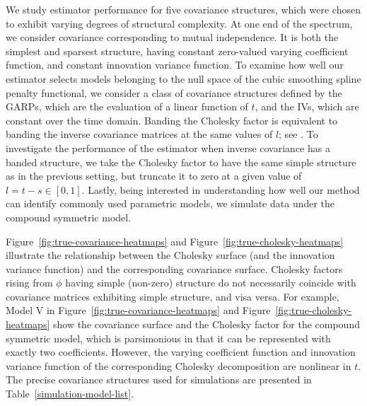 \documentclass[12pt]{article}
\theoremstyle{definition}
\begin{document}
We study estimator performance for five covariance structures, which were chosen to exhibit varying degrees of structural complexity. At one end of the spectrum, we consider covariance corresponding to mutual independence. It is both the simplest and sparsest structure, having constant zero-valued varying coefficient function, and constant innovation variance function. To examine how well our estimator selects models belonging to the null space of the cubic smoothing spline penalty functional, we consider a class of covariance structures defined by the GARPs, which are the evaluation of a linear function of $t$, and the IVs, which are constant over the time domain. Banding the Cholesky factor is equivalent to banding the inverse covariance matrices at the same values of $l$; see \citet{bickel2008regularized}.  To investigate the performance of the estimator when inverse covariance has a banded structure, we take the Cholesky factor to have the same simple structure as in the previous setting, but truncate it to zero at a given value of $l = t - s \in \left[0,1\right]$. Lastly, being interested in understanding how well our method can identify commonly used parametric models, we simulate data under the compound symmetric model. 

\bigskip

Figure~\ref{fig:true-covariance-heatmaps} and Figure~\ref{fig:true-cholesky-heatmaps} illustrate the relationship between the Cholesky surface (and the innovation variance function) and the corresponding covariance surface.  Cholesky factors rising from $\phi$ having simple (non-zero) structure do not necessarily coincide with covariance matrices exhibiting simple structure, and visa versa. For example, Model V in Figure~\ref{fig:true-covariance-heatmaps} and Figure~\ref{fig:true-cholesky-heatmaps} show the covariance surface and the Cholesky factor for the compound symmetric model, which is parsimonious in that it can be represented with exactly two coefficients. However, the varying coefficient function and innovation variance function of the corresponding Cholesky decomposition are nonlinear in $t$.  The precise covariance structures used for simulations are presented in Table~\ref{simulation-model-list}.  





%
\end{document}
